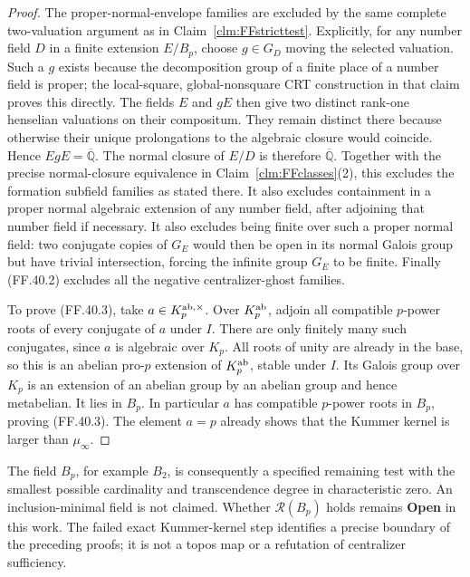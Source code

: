 \begin{proof}
The proper-normal-envelope families
are excluded by the same complete
two-valuation argument as in
Claim~\ref{clm:FFstricttest}.
Explicitly, for any number field
\(D\) in a finite extension
\(E/B_p\), choose
\(g\in G_D\) moving the selected
valuation. Such a \(g\) exists
because the decomposition group
of a finite place of a number
field is proper; the local-square,
global-nonsquare CRT construction
in that claim proves this directly.
The fields \(E\) and \(gE\)
then give two distinct rank-one
henselian valuations on their
compositum. They remain distinct
there because otherwise their
unique prolongations to the
algebraic closure would coincide.
Hence \(EgE=\overline{\mathbb Q}\).
The normal closure of \(E/D\)
is therefore \(\overline{\mathbb Q}\).
Together with the precise normal-closure
equivalence in Claim~\ref{clm:FFclasses}(2),
this excludes the formation subfield
families as stated there. It also
excludes containment in a
proper normal algebraic extension
of any number field, after
adjoining that number field if
necessary. It also excludes being
finite over such a proper normal
field: two conjugate copies of
\(G_E\) would then be open in
its normal Galois group but have
trivial intersection, forcing
the infinite group \(G_E\) to
be finite. Finally (FF.40.2)
excludes all the negative
centralizer-ghost families.

To prove (FF.40.3), take
\(a\in K_p^{{\rm ab},\times}\).
Over \(K_p^{\rm ab}\), adjoin
all compatible \(p\)-power
roots of every conjugate of
\(a\) under \(I\). There are
only finitely many such conjugates,
since \(a\) is algebraic over
\(K_p\). All roots of unity
are already in the base, so
this is an abelian pro-\(p\)
extension of \(K_p^{\rm ab}\),
stable under \(I\). Its Galois
group over \(K_p\) is an
extension of an abelian group
by an abelian group and hence
metabelian. It lies in \(B_p\).
In particular \(a\) has
compatible \(p\)-power roots
in \(B_p\), proving (FF.40.3).
The element \(a=p\) already
shows that the Kummer kernel
is larger than \(\mu_\infty\).
\end{proof}

The field \(B_p\), for example \(B_2\),
is consequently a specified remaining
test with the smallest possible
cardinality and transcendence degree
in characteristic zero. An
inclusion-minimal field is not
claimed. Whether \(\mathcal R(B_p)\)
holds remains \textbf{Open} in
this work. The failed exact
Kummer-kernel step identifies a
precise boundary of the preceding
proofs; it is not a topos map or
a refutation of centralizer
sufficiency.
